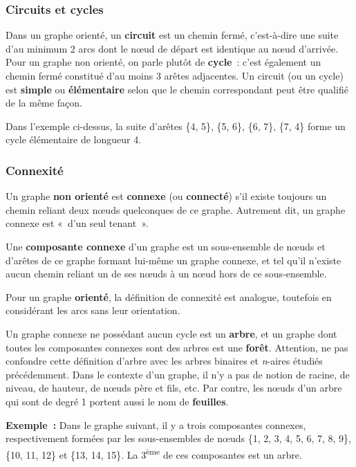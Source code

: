 		\subsubsection{Circuits et cycles}
			
			Dans un graphe orienté, un \textbf{circuit} est un chemin fermé, 
			c'est-à-dire une suite d'au minimum 2 arcs dont le n{\oe}ud de 
			départ est identique au n{\oe}ud d'arrivée. Pour un graphe non 
			orienté, on parle plutôt de \textbf{cycle}~:
			c'est également un chemin fermé constitué d'au moins 3 arêtes 
			adjacentes. Un circuit (ou un cycle) est \textbf{simple}
			ou \textbf{élémentaire} selon que le chemin correspondant 
			peut être qualifié de la même façon.

			Dans l'exemple ci-dessus, la suite d'arêtes 
			\{4, 5\}, \{5, 6\}, \{6, 7\}, \{7, 4\} 
			forme un cycle élémentaire de	longueur 4.

		\subsubsection{Connexité}
		
		Un graphe \textbf{non orienté} est \textbf{connexe} 
		(ou \textbf{connecté}) s'il existe toujours un chemin 
		reliant deux n{\oe}uds quelconques de ce graphe. 
		Autrement dit, un graphe connexe est «~d'un seul tenant~».

		Une \textbf{composante connexe} d'un graphe est un sous-ensemble 
		de n{\oe}uds et d'arêtes de ce graphe formant lui-même
		un graphe connexe, et tel qu'il n'existe aucun chemin reliant 
		un de ses n{\oe}uds à un n{\oe}ud hors de ce sous-ensemble.

		Pour un graphe \textbf{orienté}, la définition de connexité est 
		analogue, toutefois en considérant les arcs sans leur orientation.

		Un graphe connexe ne possédant aucun cycle est un \textbf{arbre}, 
		et un graphe dont toutes les composantes connexes sont des arbres 
		est une \textbf{forêt}. Attention, ne pas confondre cette 
		définition d'arbre avec les arbres binaires et \textit{n}-aires 
		étudiés précédemment. Dans le contexte d'un graphe, il n'y a pas 
		de notion de racine, de niveau, de hauteur, de n{\oe}uds père et fils, etc. 
		Par contre, les n{\oe}uds d'un arbre qui sont de degré 1 portent aussi le
		nom de \textbf{feuilles}.

		\textbf{Exemple~:} Dans le graphe suivant, il y a trois composantes 
		connexes, respectivement formées par les sous-ensembles de n{\oe}uds 
		\{1, 2, 3, 4, 5, 6, 7, 8, 9\}, \{10, 11, 12\} et \{13, 14, 15\}. 
		La 3\textsuperscript{ème} de ces composantes est un arbre.

